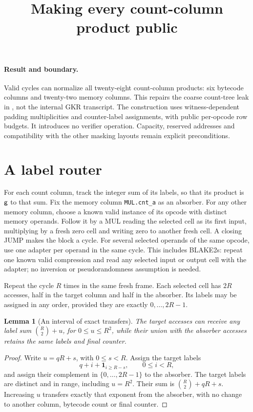 \documentclass[11pt]{article}
\title{Making every count-column product public}
\author{}
\date{}
\newtheorem{lemma}{Lemma}
\begin{document}
\maketitle
\vspace{-2em}

\paragraph{Result and boundary.} Valid cycles can normalize all twenty-eight count-column products: six bytecode columns and twenty-two memory columns. This repairs the coarse count-tree leak in , not the internal GKR transcript. The construction uses witness-dependent padding multiplicities and counter-label assignments, with public per-opcode row budgets. It introduces no verifier operation. Capacity, reserved addresses and compatibility with the other masking layouts remain explicit preconditions.

\section{A label router}

For each count column, track the integer sum of its labels, so that its product is $\mathsf{g}$ to that sum. Fix the memory column \texttt{MUL.cnt\_a} as an absorber. For any other memory column, choose a known valid instance of its opcode with distinct memory operands. Follow it by a MUL reading the selected cell as its first input, multiplying by a fresh zero cell and writing zero to another fresh cell. A closing JUMP makes the block a cycle. For several selected operands of the same opcode, use one adapter per operand in the same cycle. This includes BLAKE2s: repeat one known valid compression and read any selected input or output cell with the adapter; no inversion or pseudorandomness assumption is needed.

Repeat the cycle $R$ times in the same fresh frame. Each selected cell has $2R$ accesses, half in the target column and half in the absorber. Its labels may be assigned in any order, provided they are exactly $0,\ldots,2R-1$.

\begin{lemma}[An interval of exact transfers]
The target accesses can receive any label sum $\binom R2+u$, for $0\le u\le R^2$, while their union with the absorber accesses retains the same labels and final counter.
\end{lemma}
\begin{proof}
Write $u=qR+s$, with $0\le s<R$. Assign the target labels
\[
 q+i+\mathbf 1_{i\ge R-s},\qquad 0\le i<R,
\]
and assign their complement in $\{0,\ldots,2R-1\}$ to the absorber. The target labels are distinct and in range, including $u=R^2$. Their sum is $\binom R2+qR+s$. Increasing $u$ transfers exactly that exponent from the absorber, with no change to another column, bytecode count or final counter.
\end{proof}
\end{document}
